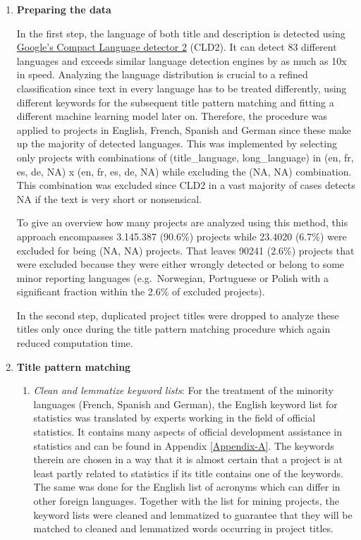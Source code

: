 \documentclass[
]{article}
\providecommand{\tightlist}{%
  \setlength{\itemsep}{0pt}\setlength{\parskip}{0pt}}
\begin{document}
\begin{enumerate}
\def\labelenumi{\arabic{enumi}.}
\item
  \textbf{Preparing the data}

  In the first step, the language of both title and description is detected using \href{https://github.com/CLD2Owners/cld2}{Google's Compact Language detector 2} (CLD2). It can detect 83 different languages and exceeds similar language detection engines by as much as 10x in speed. Analyzing the language distribution is crucial to a refined classification since text in every language has to be treated differently, using different keywords for the subsequent title pattern matching and fitting a different machine learning model later on. Therefore, the procedure was applied to projects in English, French, Spanish and German since these make up the majority of detected languages. This was implemented by selecting only projects with combinations of (title\_language, long\_language) in (en, fr, es, de, NA) x (en, fr, es, de, NA) while excluding the (NA, NA) combination. This combination was excluded since CLD2 in a vast majority of cases detects NA if the text is very short or nonsensical.

  To give an overview how many projects are analyzed using this method, this approach encompasses 3.145.387 (90.6\%) projects while 23.4020 (6.7\%) were excluded for being (NA, NA) projects. That leaves 90241 (2.6\%) projects that were excluded because they were either wrongly detected or belong to some minor reporting languages (e.g.~Norwegian, Portuguese or Polish with a significant fraction within the 2.6\% of excluded projects).

  In the second step, duplicated project titles were dropped to analyze these titles only once during the title pattern matching procedure which again reduced computation time.
\item
  \textbf{Title pattern matching}

  \begin{enumerate}
  \def\labelenumii{\roman{enumii}.}
  \tightlist
  \item
    \emph{Clean and lemmatize keyword lists}: For the treatment of the minority languages (French, Spanish and German), the English keyword list for statistics was translated by experts working in the field of official statistics. It contains many aspects of official development assistance in statistics and can be found in Appendix \ref{Appendix-A}. The keywords therein are chosen in a way that it is almost certain that a project is at least partly related to statistics if its title contains one of the keywords. The same was done for the English list of acronyms which can differ in other foreign languages. Together with the list for mining projects, the keyword lists were cleaned and lemmatized to guarantee that they will be matched to cleaned and lemmatized words occurring in project titles.
  \end{enumerate}


\end{enumerate}
\end{document}
